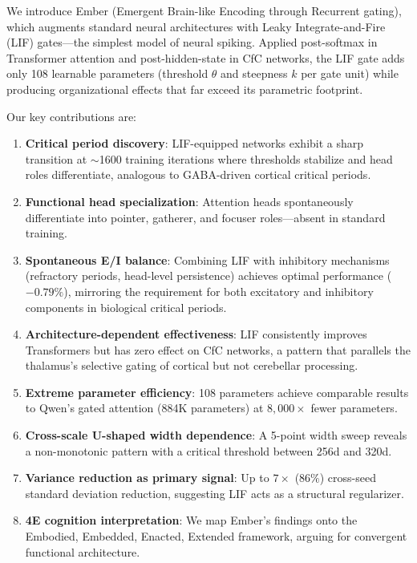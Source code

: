 \documentclass[11pt]{article}
\begin{document}
We introduce Ember (Emergent Brain-like Encoding through Recurrent gating), which augments standard neural architectures with Leaky Integrate-and-Fire (LIF) gates---the simplest model of neural spiking. Applied post-softmax in Transformer attention and post-hidden-state in CfC networks, the LIF gate adds only 108 learnable parameters (threshold $\theta$ and steepness $k$ per gate unit) while producing organizational effects that far exceed its parametric footprint.

Our key contributions are:
\begin{enumerate}
    \item \textbf{Critical period discovery}: LIF-equipped networks exhibit a sharp transition at $\sim$1600 training iterations where thresholds stabilize and head roles differentiate, analogous to GABA-driven cortical critical periods.
    \item \textbf{Functional head specialization}: Attention heads spontaneously differentiate into pointer, gatherer, and focuser roles---absent in standard training.
    \item \textbf{Spontaneous E/I balance}: Combining LIF with inhibitory mechanisms (refractory periods, head-level persistence) achieves optimal performance ($-0.79\%$), mirroring the requirement for both excitatory and inhibitory components in biological critical periods.
    \item \textbf{Architecture-dependent effectiveness}: LIF consistently improves Transformers but has zero effect on CfC networks, a pattern that parallels the thalamus's selective gating of cortical but not cerebellar processing.
    \item \textbf{Extreme parameter efficiency}: 108 parameters achieve comparable results to Qwen's gated attention \citep{yang2025qwen3} (884K parameters) at $8{,}000\times$ fewer parameters.
    \item \textbf{Cross-scale U-shaped width dependence}: A 5-point width sweep reveals a non-monotonic pattern with a critical threshold between 256d and 320d.
    \item \textbf{Variance reduction as primary signal}: Up to $7\times$ ($86\%$) cross-seed standard deviation reduction, suggesting LIF acts as a structural regularizer.
    \item \textbf{4E cognition interpretation}: We map Ember's findings onto the Embodied, Embedded, Enacted, Extended framework, arguing for convergent functional architecture.
\end{enumerate}
\end{document}
